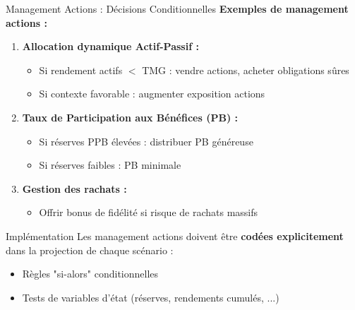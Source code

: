\documentclass[10pt,aspectratio=169]{beamer}
\begin{document}
\begin{frame}{Management Actions : Décisions Conditionnelles}
\textbf{Exemples de management actions :}

\begin{enumerate}
    \item \textbf{Allocation dynamique Actif-Passif :}
    \begin{itemize}
        \item Si rendement actifs $<$ TMG : vendre actions, acheter obligations sûres
        \item Si contexte favorable : augmenter exposition actions
    \end{itemize}
    
    \item \textbf{Taux de Participation aux Bénéfices (PB) :}
    \begin{itemize}
        \item Si réserves PPB élevées : distribuer PB généreuse
        \item Si réserves faibles : PB minimale
    \end{itemize}
    
    \item \textbf{Gestion des rachats :}
    \begin{itemize}
        \item Offrir bonus de fidélité si risque de rachats massifs
    \end{itemize}
\end{enumerate}

\vspace{0.3cm}
\begin{alertblock}{Implémentation}
Les management actions doivent être \textbf{codées explicitement} dans la projection de chaque scénario :
\begin{itemize}
    \item Règles "si-alors" conditionnelles
    \item Tests de variables d'état (réserves, rendements cumulés, ...)
\end{itemize}
\end{alertblock}
\end{frame}
\end{document}
